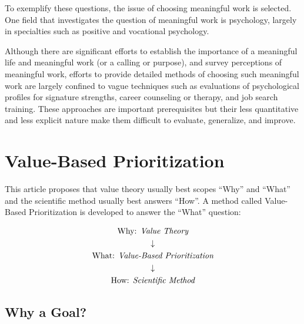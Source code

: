 \documentclass[10pt, a4paper, twocolumn]{IEEEconf}
\begin{document}
To exemplify these questions, the issue of choosing meaningful work is selected. One field that investigates the question of meaningful work is psychology, largely in specialties such as positive and vocational psychology.

Although there are significant efforts to establish the importance of a meaningful life\cite{martela2016three,baumeister1991meanings,frankl1985man,baumeister2013some,park2013assessing,allan2015meaning,heintzelman2013knowing} and meaningful work\cite{steger2013experiencing,dik2009calling,oades2017wiley,steger2009if} (or a calling\cite{dik2012make} or purpose\cite{george2013meaning}), and survey perceptions of meaningful work\cite{steger2006meaning}, efforts to provide detailed methods of choosing such meaningful work are largely confined to vague techniques such as evaluations of psychological profiles for signature strengths\cite{seligman2006learned}, career counseling\cite{dik2009calling} or therapy\cite{wong2010meaning}, and job search training\cite{zikic2009job}. These approaches are important prerequisites but their less quantitative and less explicit nature make them difficult to evaluate, generalize, and improve.

\section{Value-Based Prioritization}

This article proposes that value theory usually best scopes \enquote{Why} and \enquote{What} and the scientific method usually best answers \enquote{How}.
A method called Value-Based Prioritization is developed to answer the \enquote{What} question:

\begin{equation*}
  \begin{gathered}
    \textrm{Why: } \textit{Value Theory} \\
    \downarrow \\
    \textrm{What: } \textit{\textit{Value-Based Prioritization}} \\
    \downarrow \\
    \textrm{How: } \textit{Scientific Method}
  \end{gathered}
\end{equation*}

\subsection{Why a Goal?}
\end{document}
